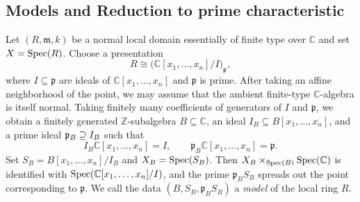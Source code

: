 \documentclass[12pt]{amsart}
\numberwithin{equation}{theorem}
\theoremstyle{plain}
\newcommand{\fm}{\mathfrak{m}}
\newcommand{\CC}{\mathbb{C}}
\newcommand{\NN}{\mathbb{N}}
\DeclareMathOperator{\FPT}{fpt}
\begin{document}

\subsection{Models and Reduction to prime characteristic}
Let $(R,\fm,k)$ be a normal local domain essentially of finite type over $\CC$ and set $X=\operatorname{{Spec}}(R)$. Choose a presentation
\[
  R\cong\bigl(\mathbb C[x_1,\ldots,x_n]/I\bigr)_{\mathfrak p},
\]
where $I\subseteq\mathfrak p$ are ideals of $\mathbb C[x_1,\ldots,x_n]$ and $\mathfrak p$ is prime.  After taking an affine neighborhood of the point, we may assume that the ambient finite-type $\mathbb C$-algebra is itself normal. Taking finitely many coefficients of generators of $I$ and $\mathfrak p$, we
obtain a finitely generated $\mathbb Z$-subalgebra $B\subseteq\mathbb C$, an ideal $I_B\subseteq B[x_1,\ldots,x_n]$, and a prime ideal $\mathfrak{p}_B\supseteq I_B$ such that
\[
  I_B\mathbb C[x_1,\ldots,x_n]=I,
  \qquad
  \mathfrak p_B\mathbb C[x_1,\ldots,x_n]=\mathfrak p.
\]
Set $S_B=B[x_1,\ldots,x_n]/I_B$ and $X_B=\operatorname{{Spec}}(S_B)$.  Then $X_B\times_{\Spec(B)}\Spec(\CC)$ is identified with $\operatorname{{Spec}}(\mathbb C[x_1,\ldots,x_n]/I)$, and the prime
$\mathfrak p_BS_B$ spreads out the point corresponding to $\mathfrak p$. We call the data $(B,S_B,\mathfrak p_BS_B)$ a \emph{model} of the local ring $R$.  
\end{document}

